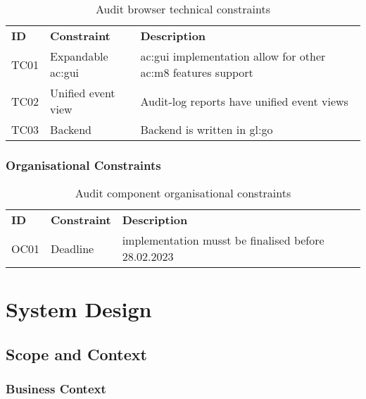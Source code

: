 \begin{table}[H]
  \begin{center}
    \caption{Audit browser technical constraints}
    \label{tab:abtc}
    \def\arraystretch{1.5}
    \begin{tabularx}{\linewidth}{|l l X |}
      \hline
      \rowcolor{gray!20}
      \textbf{ID} & \textbf{Constraint} & \textbf{Description}\\
      TC01 & Expandable \gls{ac:gui} & \gls{ac:gui} implementation allow for other \gls{ac:m8} features support\\
      TC02 & Unified event view & Audit-log reports have unified event views\\
      TC03\label{tc:ab03} & Backend & Backend is written in \gls{gl:go}\\
      \hline
    \end{tabularx}
  \end{center}
\end{table}

\subsubsection{Organisational Constraints}

\begin{table}[H]
  \begin{center}
    \caption{Audit component organisational constraints}
    \label{tab:acoc}
    \def\arraystretch{1.5}
    \begin{tabularx}{\linewidth}{|l l X |}
      \hline
      \rowcolor{gray!20}
      \textbf{ID} & \textbf{Constraint} & \textbf{Description}\\
      OC01 & Deadline & implementation musst be finalised before 28.02.2023\\
      \hline
    \end{tabularx}
  \end{center}
\end{table}

\section{System Design}

\subsection{Scope and Context}

\subsubsection{Business Context}

